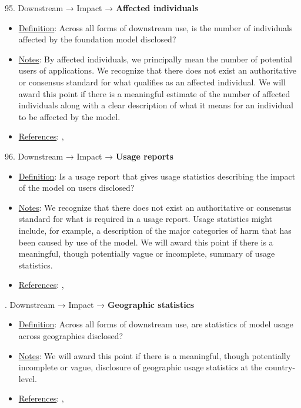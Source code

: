 95. Downstream → Impact → \textbf{Affected individuals}
\vspace{-\parskip}
\begin{itemize}
	\item
	\underline{Definition}: Across all forms of downstream use, is the number of individuals affected by the foundation model disclosed?
	\item
	\underline{Notes}: By affected individuals, we principally mean the number of potential users of applications. We recognize that there does not exist an authoritative or consensus standard for what qualifies as an affected individual. We will award this point if there is a meaningful estimate of the number of affected individuals along with a clear description of what it means for an individual to be affected by the model.
	\item
	\underline{References}: \citet{vipra2023concentration}, \citet{bommasani2023ecosystem}
\end{itemize}


96. Downstream → Impact → \textbf{Usage reports}
\vspace{-\parskip}
\begin{itemize}
	\item
	\underline{Definition}: Is a usage report that gives usage statistics describing the impact of the model on users disclosed?
	\item
	\underline{Notes}: We recognize that there does not exist an authoritative or consensus standard for what is required in a usage report. Usage statistics might include, for example, a description of the major categories of harm that has been caused by use of the model. We will award this point if there is a meaningful, though potentially vague or incomplete, summary of usage statistics.
	\item
	\underline{References}: \citet{brown2023allocating}, \citet{bommasani2023ecosystem}
\end{itemize}


. Downstream → Impact → \textbf{Geographic statistics}
\vspace{-\parskip}
\begin{itemize}
	\item
	\underline{Definition}: Across all forms of downstream use, are statistics of model usage across geographies disclosed?
	\item
	\underline{Notes}: We will award this point if there is a meaningful, though potentially incomplete or vague, disclosure of geographic usage statistics at the country-level.
	\item
	\underline{References}: \citet{brown2023allocating}, \citet{bommasani2023ecosystem}
\end{itemize}


